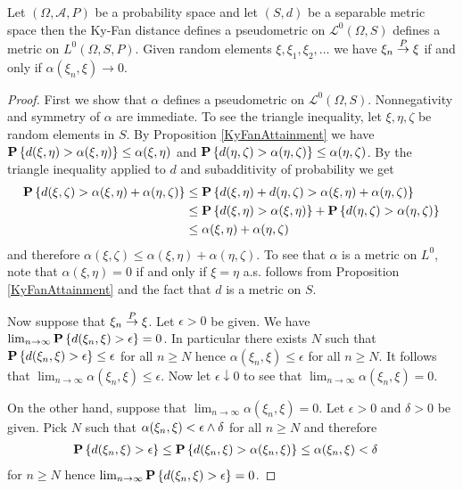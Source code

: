 \begin{thm}\label{KyFanMetric}Let $(\Omega, \mathcal{A}, P)$ be a probability space and let $(S,d)$ be a separable metric space then the Ky-Fan distance defines a pseudometric on $\mathcal{L}^0(\Omega, S)$ defines a metric on $L^0(\Omega, S, P)$.  Given random elements $\xi, \xi_1, \xi_2, \dotsc$ we have $\xi_n \overset{P}\to \xi$ if and only if $
\alpha(\xi_n, \xi) \to 0$.
\end{thm}
\begin{proof}
First we show that $\alpha$ defines a pseudometric on $\mathcal{L}^0(\Omega, S)$.  Nonnegativity and symmetry of $\alpha$ are immediate.  To see the triangle inequality, let $\xi, \eta, \zeta$ be random elements in $S$.  By Proposition \ref{KyFanAttainment} we have $\textbf{P}\left \{d(\xi, \eta) > \alpha(\xi, \eta) \right \} \leq \alpha(\xi, \eta)$ and $\textbf{P}\left \{d(\eta, \zeta) > \alpha(\eta, \zeta) \right \} \leq \alpha(\eta,\zeta)$. By the triangle
inequality applied to $d$ and subadditivity of probability we get
\begin{align*}
\textbf{P}\left \{d(\xi, \zeta) > \alpha(\xi, \eta) + \alpha(\eta, \zeta) \right \} 
&\leq \textbf{P}\left \{d(\xi, \eta) + d(\eta,\zeta) > \alpha(\xi, \eta) + \alpha(\eta, \zeta) \right \} \\
&\leq \textbf{P}\left \{d(\xi, \eta) > \alpha(\xi, \eta) \right \} + \textbf{P}\left \{d(\eta,\zeta) > \alpha(\eta, \zeta) \right \}\\
&\leq  \alpha(\xi, \eta) + \alpha(\eta, \zeta)
\end{align*}
and therefore $\alpha(\xi, \zeta) \leq \alpha(\xi, \eta) + \alpha(\eta, \zeta)$.   To see that $\alpha$ is a metric on $L^0$, note that $\alpha(\xi,\eta) = 0$ if and only if $\xi = \eta$ a.s. follows from Proposition \ref{KyFanAttainment} and the fact that $d$ is a metric on $S$.  

Now suppose that $\xi_n \overset{P}\to \xi$.  Let $\epsilon > 0$ be given.  We have $\lim_{n \to \infty} \textbf{P}\left \{d(\xi_n, \xi) > \epsilon \right \} = 0$.  In particular there exists $N$ such that $\textbf{P}\left \{d(\xi_n, \xi) > \epsilon \right \} \leq \epsilon$ for all $n \geq N$ hence $\alpha(\xi_n, \xi) \leq \epsilon$ for all $n \geq N$.  It follows that $\lim_{n \to \infty} \alpha(\xi_n, \xi) \leq \epsilon$.  Now let $\epsilon \downarrow 0$ to see that $\lim_{n \to \infty} \alpha(\xi_n, \xi) = 0$.

On the other hand, suppose that $\lim_{n \to \infty} \alpha(\xi_n, \xi) = 0$.  Let $\epsilon > 0$ and $\delta >0$ be given.  Pick $N$ such that $\alpha(\xi_n, \xi) < \epsilon \wedge \delta$ for all $n \geq N$ and therefore
\begin{align*}
\textbf{P}\left \{d(\xi_n, \xi) > \epsilon \right \} &\leq \textbf{P}\left \{d(\xi_n, \xi) > \alpha(\xi_n, \xi) \right \} \leq \alpha(\xi_n, \xi) < \delta
\end{align*}
for $n \geq N$ hence $\lim_{n \to \infty} \textbf{P}\left \{d(\xi_n, \xi) > \epsilon \right \} =0$.
\end{proof}


